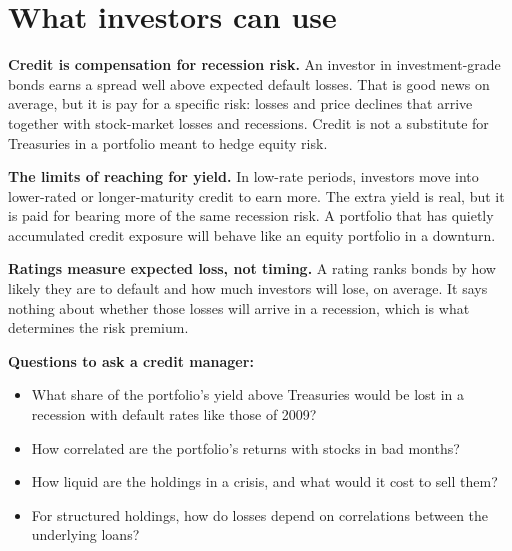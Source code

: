 \section{What investors can use}
\label{sec:18-investors}

\textbf{Credit is compensation for recession risk.} An investor in investment-grade bonds earns a spread well above expected default losses. That is good news on average, but it is pay for a specific risk: losses and price declines that arrive together with stock-market losses and recessions. Credit is not a substitute for Treasuries in a portfolio meant to hedge equity risk.

\textbf{The limits of reaching for yield.} In low-rate periods, investors move into lower-rated or longer-maturity credit to earn more. The extra yield is real, but it is paid for bearing more of the same recession risk. A portfolio that has quietly accumulated credit exposure will behave like an equity portfolio in a downturn.

\textbf{Ratings measure expected loss, not timing.} A rating ranks bonds by how likely they are to default and how much investors will lose, on average. It says nothing about whether those losses will arrive in a recession, which is what determines the risk premium.

\textbf{Questions to ask a credit manager:}

\begin{itemize}
  \item What share of the portfolio's yield above Treasuries would be lost in a recession with default rates like those of 2009?
  \item How correlated are the portfolio's returns with stocks in bad months?
  \item How liquid are the holdings in a crisis, and what would it cost to sell them?
  \item For structured holdings, how do losses depend on correlations between the underlying loans?
\end{itemize}

